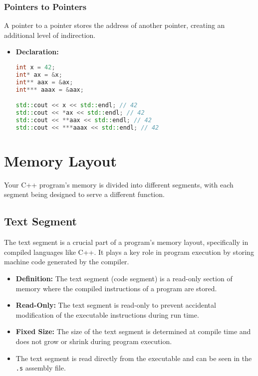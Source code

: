 \documentclass{article}
\begin{document}
\subsubsection{Pointers to Pointers}

\noindent  
A pointer to a pointer stores the address of another pointer, creating an additional level of indirection.

\begin{itemize}
    \item \textbf{Declaration:}
\begin{lstlisting}[language=C++]
int x = 42;
int* ax = &x;
int** aax = &ax;
int*** aaax = &aax;

std::cout << x << std::endl; // 42
std::cout << *ax << std::endl; // 42
std::cout << **aax << std::endl; // 42
std::cout << ***aaax << std::endl; // 42
\end{lstlisting}

\end{itemize}

\section{Memory Layout}

\noindent
Your C++ program's memory is divided into different segments, with each segment being designed to serve a different function.

\subsection{Text Segment}

\noindent
The text segment is a crucial part of a program’s memory layout, specifically in compiled languages like C++. It plays a key role in program execution by storing machine code generated by the compiler.

\begin{itemize}
	\item \textbf{Definition:} The text segment (code segment) is a read-only section of memory where the compiled instructions of a program are stored.
	\item \textbf{Read-Only:} The text segment is read-only to prevent accidental modification of the executable instructions during run time.
	\item \textbf{Fixed Size:} The size of the text segment is determined at compile time and does not grow or shrink during program execution.
	\item The text segment is read directly from the executable and can be seen in the \texttt{.s} assembly file.
\end{itemize} 
\end{document}
